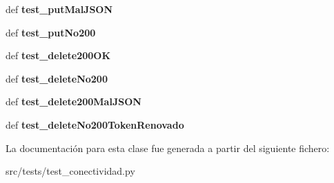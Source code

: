 \begin{DoxyCompactItemize}
\item 
\hypertarget{classsrc_1_1tests_1_1test__conectividad_1_1_test_conectividad_a13610804c14418f1678b31d22b534673}{def {\bfseries test\-\_\-put\-Mal\-J\-S\-O\-N}}\label{classsrc_1_1tests_1_1test__conectividad_1_1_test_conectividad_a13610804c14418f1678b31d22b534673}

\item 
\hypertarget{classsrc_1_1tests_1_1test__conectividad_1_1_test_conectividad_a9b93248598f6aa551eb0050563dafb3d}{def {\bfseries test\-\_\-put\-No200}}\label{classsrc_1_1tests_1_1test__conectividad_1_1_test_conectividad_a9b93248598f6aa551eb0050563dafb3d}

\item 
\hypertarget{classsrc_1_1tests_1_1test__conectividad_1_1_test_conectividad_a12a6018f85e7e335a349026020db2051}{def {\bfseries test\-\_\-delete200\-O\-K}}\label{classsrc_1_1tests_1_1test__conectividad_1_1_test_conectividad_a12a6018f85e7e335a349026020db2051}

\item 
\hypertarget{classsrc_1_1tests_1_1test__conectividad_1_1_test_conectividad_a5e7c145fe6d1e8de979634fba5252305}{def {\bfseries test\-\_\-delete\-No200}}\label{classsrc_1_1tests_1_1test__conectividad_1_1_test_conectividad_a5e7c145fe6d1e8de979634fba5252305}

\item 
\hypertarget{classsrc_1_1tests_1_1test__conectividad_1_1_test_conectividad_a9daa32aa5ecb940f33f853b6cb66ecc3}{def {\bfseries test\-\_\-delete200\-Mal\-J\-S\-O\-N}}\label{classsrc_1_1tests_1_1test__conectividad_1_1_test_conectividad_a9daa32aa5ecb940f33f853b6cb66ecc3}

\item 
\hypertarget{classsrc_1_1tests_1_1test__conectividad_1_1_test_conectividad_a7b975f993b7b8a81772f18dd23e5298d}{def {\bfseries test\-\_\-delete\-No200\-Token\-Renovado}}\label{classsrc_1_1tests_1_1test__conectividad_1_1_test_conectividad_a7b975f993b7b8a81772f18dd23e5298d}

\end{DoxyCompactItemize}


La documentación para esta clase fue generada a partir del siguiente fichero\-:\begin{DoxyCompactItemize}
\item 
src/tests/test\-\_\-conectividad.\-py\end{DoxyCompactItemize}
